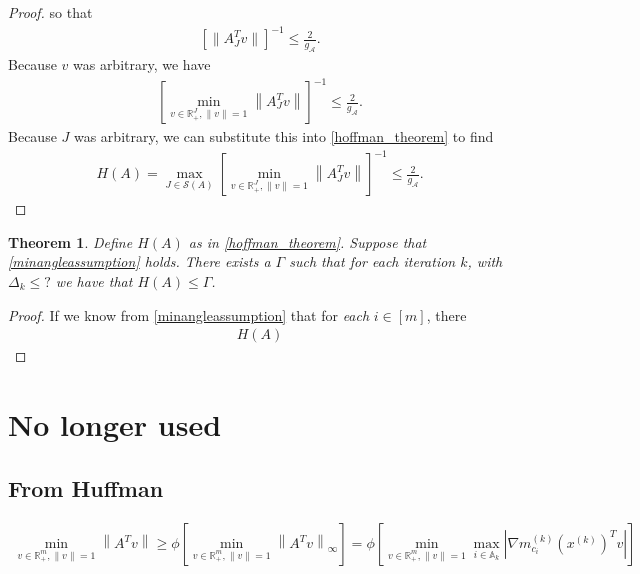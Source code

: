 \documentclass{article}
\newtheorem{theorem}{Theorem}[section]
\theoremstyle{case}
\numberwithin{theorem}{subsection}
\newcommand{\activeconstraintsk}{{\mathbb A_{k}}}
\newcommand{\dk}{\Delta_k}
\newcommand{\gmcik}{{\nabla m_{c_i}^{(k)}\left(\xk\right)}}
\newcommand{\minactivegrad}{{ g_{\mathcal A} }}
\newcommand{\Rm}{\mathbb R^m}
\newcommand{\xk}{x^{(k)}}
\begin{document}
\begin{proof}
so that 
\begin{align*}
\left[{\|A_J^Tv\|}\right]^{-1} \le \frac 2 {\minactivegrad}.
\end{align*}
Because $v$ was arbitrary, we have
\begin{align*}
\left[\min_{v \in \mathbb R^J_+, \|v\| = 1}  \left\|A_J^Tv\right\| \right]^{-1} \le \frac 2 {\minactivegrad}.
\end{align*}
Because $J$ was arbitrary, we can substitute this into \cref{hoffman_theorem} to find
\begin{align*}
H(A) = \max_{J \in \mathcal S(A)} \left[\min_{v \in \mathbb R^J_+, \|v\| = 1}  \left\|A_J^Tv\right\| \right]^{-1} \le \frac 2 {\minactivegrad}.
\end{align*}


\end{proof}


\begin{theorem}
\label{bounded_huffman_constant}
Define $H(A)$ as in \cref{hoffman_theorem}.
Suppose that \cref{minangleassumption} holds.
There exists a $\Gamma$ such that for each iteration $k$,
with $\dk \le ?$ we have that $H(A) \le \Gamma$.
\end{theorem}

\begin{proof}
If we know from \cref{minangleassumption} that for \emph{each} $i \in [m]$, there 
\begin{align*}
H(A)
\end{align*}
\end{proof}

\section{No longer used}



\subsection{From Huffman}




\color{red}
\begin{align*}
\min_{v \in \Rm_+, \|v\| = 1} \left\|A^Tv\right\| 
\ge \phi \left[\min_{v \in \Rm_+, \|v\| = 1} \left\|A^Tv\right\|_{\infty}\right] 
=   \phi \left[\min_{v \in \Rm_+, \|v\| = 1} \max_{i \in \activeconstraintsk} \left|\gmcik^T v\right|\right]
\end{align*}
\end{document}
